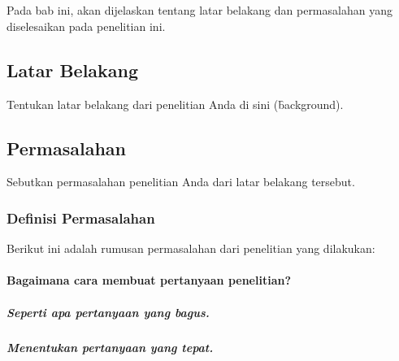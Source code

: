 \chapter{\babSatu}
Pada bab ini, akan dijelaskan tentang latar belakang dan permasalahan yang diselesaikan pada penelitian ini.


\section{Latar Belakang}
Tentukan latar belakang dari penelitian Anda di sini (\f{background}).

\section{Permasalahan}
Sebutkan permasalahan penelitian Anda dari latar belakang tersebut.

\subsection{Definisi Permasalahan}
Berikut ini adalah rumusan permasalahan dari penelitian yang dilakukan:
\subsubsection{Bagaimana cara membuat pertanyaan penelitian?}

\paragraph{Seperti apa pertanyaan yang bagus.}

\paragraph{Menentukan pertanyaan yang tepat.}


